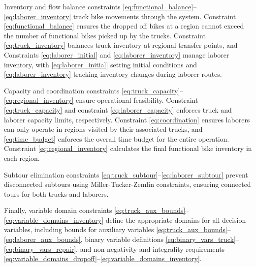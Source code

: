 Inventory and flow balance constraints \eqref{eq:functional_balance}--\eqref{eq:laborer_inventory} track bike movements through the system. Constraint \eqref{eq:functional_balance} ensures the dropped off bikes at a region cannot exceed the number of functional bikes picked up by the trucks. Constraint \eqref{eq:truck_inventory} balances truck inventory at regional transfer points, and Constraints \eqref{eq:laborer_initial} and \eqref{eq:laborer_inventory} manage laborer inventory, with \eqref{eq:laborer_initial} setting initial conditions and \eqref{eq:laborer_inventory} tracking inventory changes during laborer routes.

Capacity and coordination constraints \eqref{eq:truck_capacity}--\eqref{eq:regional_inventory} ensure operational feasibility. Constraint \eqref{eq:truck_capacity} and constraint \eqref{eq:laborer_capacity} enforces truck and laborer capacity limits, respectively. Constraint \eqref{eq:coordination} ensures laborers can only operate in regions visited by their associated trucks, and \eqref{eq:time_budget} enforces the overall time budget for the entire operation. Constraint \eqref{eq:regional_inventory} calculates the final functional bike inventory in each region.

\sloppy Subtour elimination constraints \eqref{eq:truck_subtour}--\eqref{eq:laborer_subtour} prevent disconnected subtours using Miller-Tucker-Zemlin \cite{miller1960subtour} constraints, ensuring connected tours for both trucks and laborers.

Finally, variable domain constraints \eqref{eq:truck_aux_bounds}--\eqref{eq:variable_domains_inventory} define the appropriate domains for all decision variables, including bounds for auxiliary variables \eqref{eq:truck_aux_bounds}--\eqref{eq:laborer_aux_bounds}, binary variable definitions \eqref{eq:binary_vars_truck}--\eqref{eq:binary_vars_repair}, and non-negativity and integrality requirements \eqref{eq:variable_domains_dropoff}--\eqref{eq:variable_domains_inventory}.
